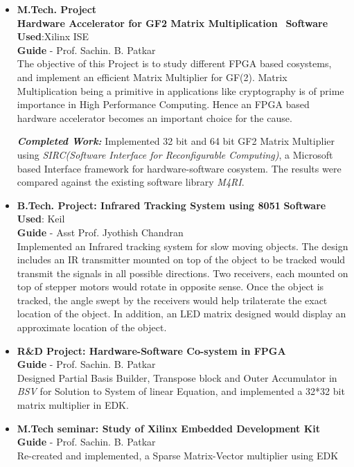 \documentclass[a4paper,10pt]{article}
\begin{document}
 \begin{itemize}

\setlength{\itemsep}{1pt}
  \item \textbf{{M.Tech. Project}}\\
	\textbf{Hardware Accelerator for GF2 Matrix Multiplication }\qquad\qquad\qquad\ \textbf{Software Used}:Xilinx ISE\\
	{\textbf{Guide} - Prof. Sachin. B. Patkar\\}
	The objective of this Project is to study different FPGA based cosystems, and implement an efficient Matrix Multiplier for GF(2).
	Matrix Multiplication being a primitive in applications like cryptography is of prime importance in High Performance Computing. 
	Hence an FPGA based hardware accelerator becomes an important choice for the cause. 
	
 \textbf{\textit{Completed Work:}} 
   Implemented 32 bit and 64 bit GF2 Matrix Multiplier using \textit{SIRC(Software Interface for Reconfigurable Computing)}, a Microsoft based Interface framework
   for hardware-software cosystem. The results were compared against the existing software library \textit{M4RI}. 



  \item \textbf{{B.Tech. Project: Infrared Tracking System using 8051}}  \qquad\qquad\qquad\qquad \textbf{Software Used}: Keil\\
        {\textbf{Guide} - Asst Prof. Jyothish Chandran\\}                                                   
	Implemented an Infrared tracking system for slow moving objects. The design includes an IR transmitter mounted on top of the 
	object to be tracked would transmit the signals in all possible directions. Two receivers, each mounted on top of stepper motors
	would rotate in opposite sense. Once the object is tracked, the angle swept by the receivers would help trilaterate the exact location of the object.
	In addition, an LED matrix designed would display an approximate location of the object.

  \item \textbf{{R\&D Project: Hardware-Software Co-system in FPGA}}\\
	{\textbf{Guide} - Prof. Sachin. B. Patkar \qquad\qquad\qquad\quad\qquad\qquad\qquad\quad\qquad\qquad\qquad\qquad\qquad\qquad\quad \\}
	Designed Partial Basis Builder, Transpose block and Outer Accumulator in \textit{BSV} for Solution to System of linear Equation, and
	implemented a 32*32 bit matrix multiplier in EDK.
	
  \item \textbf{{M.Tech seminar: Study of Xilinx Embedded Development Kit}}\\
	{\textbf{Guide} - Prof. Sachin. B. Patkar \qquad\qquad\qquad\quad\qquad\qquad\qquad\quad\qquad\qquad\qquad\qquad\qquad\qquad\quad\\}
	Re-created and implemented, a Sparse Matrix-Vector multiplier using EDK

 \end{itemize}
\end{document}
